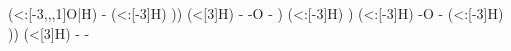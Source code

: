 \begin{struct}
{                                                                                                                                                (<:[-3,,,1]O|H)
                                                                                                                                            -
                                                                                                                                                (<:[-3]H)
                                                                                                                                        ))
                                                                                                                                            (<[3]H)
                                                                                                                                        -
                                                                                                                                        -O
                                                                                                                                        -
                                                                                                                                    )
                                                                                                                                        (<:[-3]H)
                                                                                                                                )
                                                                                                                                    (<:[-3]H)
                                                                                                                                -O
                                                                                                                                -
                                                                                                                                    (<:[-3]H)
                                                                                                                            ))
                                                                                                                                (<[3]H)
                                                                                                                            -
                                                                                                                            -
}
\end{struct}
